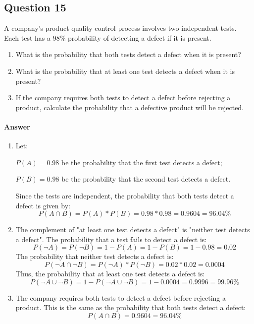 \documentclass{article}
\begin{document}
\subsection{Question 15}
A company's product quality control process involves two independent tests. Each test has a $98\%$ probability of detecting a defect if it is present.
\begin{enumerate}
    \item What is the probability that both tests detect a defect when it is present?
    \item What is the probability that at least one test detects a defect when it is present?
    \item If the company requires both tests to detect a defect before rejecting a product, calculate the probability that a defective product will be rejected.
\end{enumerate}

\paragraph{Answer}
\begin{enumerate}
    \item Let:
    
    $P(A)=0.98$ be the probability that the first test detects a defect;
    
    $P(B)=0.98$ be the probability that the second test detects a defect.
    
    Since the tests are independent, the probability that both tests detect a defect is given by:
    $$P(A \cap B) = P(A) * P(B) = 0.98*0.98=0.9604=96.04\%$$
    \item The complement of "at least one test detects a defect" is "neither test detects a defect". 
    The probability that a test fails to detect a defect is:
    $$P(\neg A)=P(\neg B)=1-P(A)=1-P(B)=1-0.98=0.02$$
    The probability that neither test detects a defect is:
    $$P(\neg A \cap \neg B) = P(\neg A) * P(\neg B) = 0.02*0.02=0.0004$$
    Thus, the probability that at least one test detects a defect is:
    $$P(\neg A \cup \neg B)=1-P(\neg A \cup \neg B)=1-0.0004 = 0.9996 = 99.96\%$$
    \item The company requires both tests to detect a defect before rejecting a product. This is the same as the probability that both tests detect a defect:
    $$P(A \cap B)=0.9604=96.04\%$$
\end{enumerate}
\end{document}
